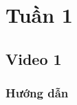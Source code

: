 \documentclass{article}
\begin{document}
\section{Tuần 1}



\subsection{Video 1}

\subsubsection{Hướng dẫn}

 



\end{document}
